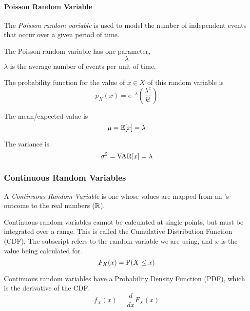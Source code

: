 \paragraph{Poisson Random Variable}\label{par:Poisson_Random_Variable}
\begin{definition}\label{def:Poisson_Random_Variable}
  The \emph{Poisson random variable} is used to model the number of independent events that occur over a given period of time.

  The Poisson random variable has one parameter,
  \begin{equation}\label{eq:Poisson_Random_Variable-Lambda_Parameter}
    \lambda
  \end{equation}
  $\lambda$ is the average number of events per unit of time.

  The probability function for the value of $x \in X$ of this random variable is
  \begin{equation}\label{eq:Poisson_Random_Variable-Probability_Function}
    p_{X}(x) = e^{-\lambda} \left( \frac{\lambda^{x}}{k!} \right)
  \end{equation}

  The mean/expected value is
  \begin{equation}\label{eq:Poisson_Random_Variable-Expected_Value}
    \mu = \operatorname{\operatorname{\mathbb{E}}}[x] = \lambda
  \end{equation}

  The variance is
  \begin{equation}\label{eq:Poisson_Random_Variable-Variance}
    \sigma^{2} = \operatorname{\operatorname{VAR}}[x] = \lambda
  \end{equation}
\end{definition}

\subsubsection{Continuous Random Variables}\label{subsubsec:Continuous_Random_Variables}
\begin{definition}\label{def:Continuous_Random_Variable}
  A \emph{Continuous Random Variable} is one whose values are mapped from an 's outcome to the real numbers ($\operatorname{\mathbb{R}}$).

  Continuous random variables cannot be calculated at single points, but must be integrated over a range.
  This is called the Cumulative Distribution Function (CDF).
  The subscript refers to the random variable we are using, and $x$ is the value being calculated for.
  \begin{equation}\label{eq:Continuous_Random_Variable-CDF}
    F_{X}(x) = \operatorname{\operatorname{P}}(X \leq x)
  \end{equation}

  Continuous random variables have a Probability Density Function (PDF), which is the derivative of the CDF.\
  \begin{equation}\label{eq:Continuous_Random_Variable-PDF}
    f_{X}(x) = \frac{d}{dx} F_{X}(x)
  \end{equation}

\end{definition}
